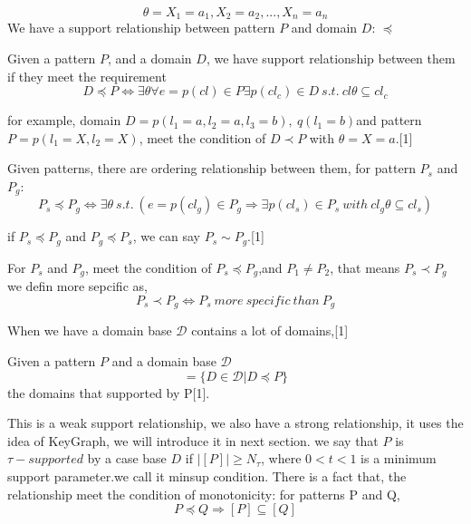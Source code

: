 \begin{displaymath}
\theta = {X_1 = a_1, X_2 = a_2,...,X_n = a_n}
\end{displaymath}
We have a support relationship between pattern $P$ and domain $D$: $\preceq$
\begin{definition}
Given a pattern $P$, and a domain $D$, we have support relationship between them if they meet the requirement
\begin{displaymath}
D\preceq P \iff \exists \theta \forall e = p(cl)\in P \exists p(cl_c)\in D \ s.t. \ cl\theta \subseteq cl_c
\end{displaymath}
\end{definition}
for example, domain $D={p(l_1 = a,l_2 = a,l_3 = b),\ q(l_1 = b)} $and pattern $P={p(l_1 = X,l_2=X)}$, meet the condition of $D\prec P$ with $\theta = {X = a}$.[1]
\begin{definition}
Given patterns, there are ordering relationship between them, for pattern $P_s$ and $P_g$:
\begin{displaymath}
P_s \preceq P_g \iff \exists \theta \ s.t. \ (e = p(cl_g)\in P_g \Rightarrow \exists p(cl_s)\in P_s\  with\ cl_g\theta \subseteq cl_s)
\end{displaymath}
\end{definition}
if $P_s\preceq P_g$ and $P_g\preceq P_s$, we can say $P_s \sim P_g$.[1]
\begin{definition}
For $P_s$ and $P_g$, meet the condition of  $P_s\preceq P_g$,and $P_1 \ne P_2$, that means $P_s\prec P_g$ we defin more sepcific as,
\begin{displaymath}
P_s\prec P_g \iff P_s\ more\ specific\ than\ P_g 
\end{displaymath}
\end{definition}
When we have a domain base $\mathcal{D}$ contains a lot of domains,[1]
\begin{definition}
Given a pattern $P$ and a domain base $\mathcal{D}$
\begin{displaymath}
[P] = \{D\in \mathcal{D}| D\preceq P\}
\end{displaymath}
the domains that supported by P[1].
\end{definition}
This is a weak support relationship, we also have a strong relationship, it uses the idea of KeyGraph, we will introduce it in next section.
we say that $P$ is $\tau-supported$ by a case base $D$ if $|[P]|\geq N_\tau$, where $0<t<1$ is a minimum support parameter.we call it minsup condition.
There is a fact that, the relationship meet the condition of monotonicity:
for patterns P and Q,
\begin{displaymath}
P \preceq Q \Rightarrow [P]\subseteq [Q]
\end{displaymath}